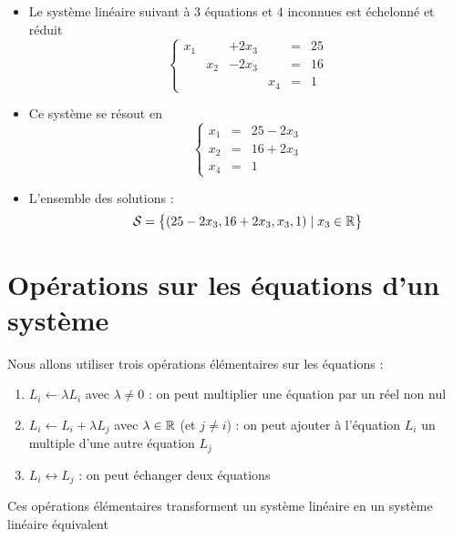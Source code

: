 \begin{frame}

\begin{exemple}
\label{syslin:exsysechel} 
\begin{itemize}
  \item Le système linéaire suivant à $3$ équations et $4$ inconnues est échelonné et réduit
$$\left\{\begin{array}{cccccc}
x_1&&+2x_3&&=&25\\
&x_2&-2x_3&&=&16\\
&&&x_4&=&1
\end{array}\right.
$$
\pause
  
  \item Ce système se résout en
$$\left\{\begin{array}{ccc}
x_1&=&25-2x_3\\
x_2&=&16+2x_3\\
x_4&=&1
\end{array}\right.
$$

\pause
  
  \item L'ensemble des solutions :
$$\mathcal{S}=\big\{(25-2x_3,16+2x_3,x_3,1) \mid x_3\in \mathbb{R} \big\}$$
  
\end{itemize}

\end{exemple}
\end{frame}



\section{Opérations sur les équations d'un système}


\begin{frame}

Nous allons utiliser trois opérations
élémentaires sur les équations : 
\medskip

\pause
\begin{enumerate}\setlength{\itemsep}{8pt}
  \item $L_i \leftarrow \lambda L_i$ avec $\lambda \neq 0$ : 
  \pause
  on peut multiplier une équation par un réel non nul
   
  \pause
  \item $L_i \leftarrow L_i+\lambda L_j$ avec $\lambda \in \mathbb{R}$ (et $j\neq i$) :
  \pause
  on peut ajouter à l'équation $L_i$ un multiple d'une autre équation $L_j$
  
  \pause
  \item $L_i \leftrightarrow L_j$ : 
  \pause
  on peut échanger deux équations
\end{enumerate}

\bigskip
\pause

Ces opérations élémentaires transforment un système linéaire en un système linéaire équivalent
\end{frame}


